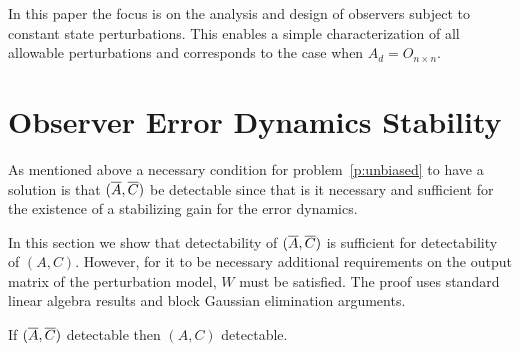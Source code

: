 \documentclass[preprint,review,11pt]{elsarticle}
\begin{document}
In this paper the focus is on the analysis and design of observers subject to constant state perturbations.  This enables a simple characterization of all allowable perturbations and corresponds to the case when $A_d=O_{n \times n}$. 




\section{Observer Error Dynamics Stability}

As mentioned above a necessary condition for problem~\ref{p:unbiased} to have a solution is that $(\overline{A},\overline{C})$ be detectable since that is it necessary and sufficient for the existence of a stabilizing gain for 
the error dynamics. 

In this section we show that detectability of $(\overline{A},\overline{C})$ is sufficient for detectability of $(A,C)$. However, for it to be necessary additional requirements on the output matrix of the perturbation model, $W$ must be satisfied.  The proof uses standard linear algebra results and block Gaussian elimination arguments.

\begin{thm} If $(\overline{A},\overline{C})$ detectable then $(A,C)$ detectable.
\label{th:suff}
\end{thm}
\end{document}
